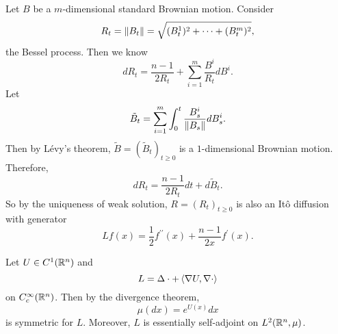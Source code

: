 \begin{exam}
    Let $B$ be a $m$-dimensional standard Brownian motion. Consider
    \begin{equation*}
    	R_t = \left\lVert B_t\right\lVert = \sqrt{(B^1_t)^2 + \cdots + (B^m_t)^2},
    \end{equation*}
    the Bessel process. Then we know
    \begin{equation*}
    	dR_t = \frac{n-1}{2R_t} + \sum_{i=1}^m \frac{B^i}{R_t}dB^i.
    \end{equation*}
    Let
    \begin{equation*}
    	\tilde{B}_t =  \sum_{i=1}^m \int_0^t \frac{B^i_s}{\left\lVert B_s\right\lVert}dB^i_s.
    \end{equation*}
    Then by L\'evy's theorem, $\tilde{B} = (\tilde{B}_t)_{t \geq 0}$ is a $1$-dimensional Brownian motion. Therefore,
    \begin{equation*}
    	dR_t = \frac{n-1}{2R_t}dt + d\tilde{B}_t.
    \end{equation*}
    So by the uniqueness of weak solution, $R=(R_t)_{t \geq 0}$ is also an It\^o diffusion with generator
    \begin{equation*}
     	Lf(x) = \frac{1}{2}f^{\prime\prime}(x) + \frac{n-1}{2x}f^\prime(x).
     \end{equation*} 
\end{exam}

\begin{exam}
    Let $U \in C^1(\mathbb{R}^n)$ and 
    \begin{equation*}
        L = \Delta \cdot + \left\langle \nabla U,\nabla \cdot \right\rangle
    \end{equation*}
    on $C^\infty_c(\mathbb{R}^n)$. Then by the divergence theorem,
    \begin{equation*}
        \mu(dx) = e^{U(x)}dx
    \end{equation*}
    is symmetric for $L$. Moreover, $L$ is essentially self-adjoint on $L^2(\mathbb{R}^n,\mu)$.
\end{exam}





